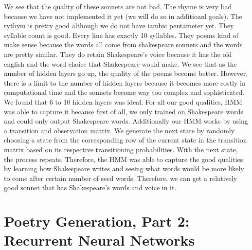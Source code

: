 We see that the quality of these sonnets are not bad. The rhyme is very bad because we have not implemented it yet (we will do so in additioanl goals). The rythym is pretty good although we do not have iambic pentameter yet. They syllable count is good. Every line has exactly 10 syllables. They poems kind of make sense because the words all come from shakespeare sonnets and the words are pretty similar. They do retain Shakespeare's voice because it has the old english and the word choice that Shakespeare would make. We see that as the number of hidden layers go up, the quality of the poems become better. However, there is a limit to the number of hidden layers because it becomes more costly in computational time and the sonnets become way too complex and sophisticated. We found that 6 to 10 hidden layers was ideal. For all our good qualities, HMM was able to capture it because first of all, we only trained on Shakespeare words and could only output Shakespeare words. Additionally our HMM works by using a transition and observation matrix. We generate the next state by randomly choosing a state from the corresponding row of the current state in the transition matrix based on its respective transitioning probabilities. With the next state, the process repeats. Therefore, the HMM was able to capture the good qualities by learning how Shakespeare writes and seeing what words would be more likely to come after certain number of seed words. Therefore, we can get a relatively good sonnet that has Shakespeare's words and voice in it.  

\newpage

\section{Poetry Generation, Part 2: Recurrent Neural Networks}
\medskip

